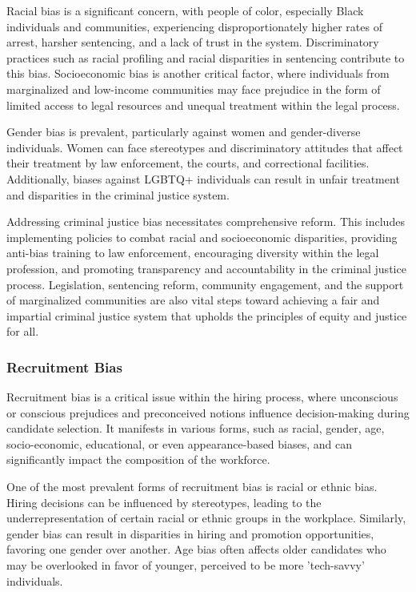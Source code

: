 \documentclass[12pt,a4paper,openright,twoside]{book}
\begin{document}
Racial bias is a significant concern, with people of color, especially Black individuals and communities, experiencing disproportionately higher rates of arrest, harsher sentencing, and a lack of trust in the system. Discriminatory practices such as racial profiling and racial disparities in sentencing contribute to this bias. Socioeconomic bias is another critical factor, where individuals from marginalized and low-income communities may face prejudice in the form of limited access to legal resources and unequal treatment within the legal process. \cite{9660177} 

Gender bias is prevalent, particularly against women and gender-diverse individuals. Women can face stereotypes and discriminatory attitudes that affect their treatment by law enforcement, the courts, and correctional facilities. Additionally, biases against LGBTQ+ individuals can result in unfair treatment and disparities in the criminal justice system. \cite{gebru2020race}

Addressing criminal justice bias necessitates comprehensive reform. This includes implementing policies to combat racial and socioeconomic disparities, providing anti-bias training to law enforcement, encouraging diversity within the legal profession, and promoting transparency and accountability in the criminal justice process. Legislation, sentencing reform, community engagement, and the support of marginalized communities are also vital steps toward achieving a fair and impartial criminal justice system that upholds the principles of equity and justice for all.


\subsubsection{Recruitment Bias}
Recruitment bias is a critical issue within the hiring process, where unconscious or conscious prejudices and preconceived notions influence decision-making during candidate selection. It manifests in various forms, such as racial, gender, age, socio-economic, educational, or even appearance-based biases, and can significantly impact the composition of the workforce. \cite{mujtaba2019ethical}

One of the most prevalent forms of recruitment bias is racial or ethnic bias. Hiring decisions can be influenced by stereotypes, leading to the underrepresentation of certain racial or ethnic groups in the workplace. Similarly, gender bias can result in disparities in hiring and promotion opportunities, favoring one gender over another. Age bias often affects older candidates who may be overlooked in favor of younger, perceived to be more 'tech-savvy' individuals.
\end{document}

